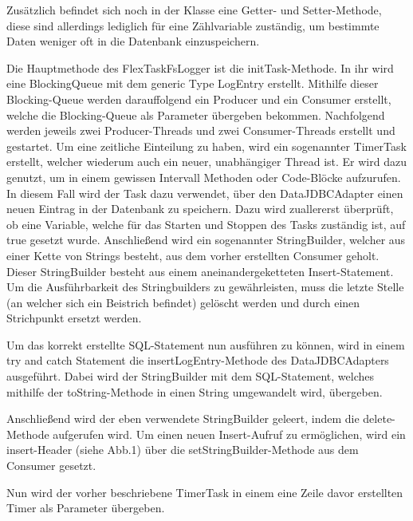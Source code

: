 Zusätzlich befindet sich noch in der Klasse eine Getter- und Setter-Methode, diese sind allerdings lediglich für eine Zählvariable zuständig, um bestimmte Daten weniger oft in die Datenbank einzuspeichern.
 
Die Hauptmethode des FlexTaskFsLogger ist die initTask-Methode. In ihr wird eine BlockingQueue mit dem generic Type LogEntry erstellt. Mithilfe dieser Blocking-Queue werden darauffolgend ein Producer und ein Consumer erstellt, welche die Blocking-Queue als Parameter übergeben bekommen. Nachfolgend werden jeweils zwei Producer-Threads und zwei Consumer-Threads erstellt und gestartet. Um eine zeitliche Einteilung zu haben, wird ein sogenannter TimerTask erstellt, welcher wiederum auch ein neuer, unabhängiger Thread ist. Er wird dazu genutzt, um in einem gewissen Intervall Methoden oder Code-Blöcke aufzurufen. In diesem Fall wird der Task dazu verwendet, über den DataJDBCAdapter einen neuen Eintrag in der Datenbank zu speichern. Dazu wird zuallererst überprüft, ob eine Variable, welche für das Starten und Stoppen des Tasks zuständig ist, auf true gesetzt wurde. Anschließend wird ein sogenannter StringBuilder, welcher aus einer Kette von Strings besteht, aus dem vorher erstellten Consumer geholt. Dieser StringBuilder besteht aus einem aneinandergeketteten Insert-Statement. Um die Ausführbarkeit des Stringbuilders zu gewährleisten, muss die letzte Stelle (an welcher sich ein Beistrich befindet) gelöscht werden und durch einen Strichpunkt ersetzt werden.
 
Um das korrekt erstellte SQL-Statement nun ausführen zu können, wird in einem try and catch Statement die insertLogEntry-Methode des DataJDBCAdapters ausgeführt. Dabei wird der StringBuilder mit dem SQL-Statement, welches mithilfe der toString-Methode in einen String umgewandelt wird, übergeben.
 
Anschließend wird der eben verwendete StringBuilder geleert, indem die delete-Methode aufgerufen wird. Um einen neuen Insert-Aufruf zu ermöglichen, wird ein insert-Header (siehe Abb.1) über die setStringBuilder-Methode aus dem Consumer gesetzt.
 
Nun wird der vorher beschriebene TimerTask in einem eine Zeile davor erstellten Timer als Parameter übergeben.
 
